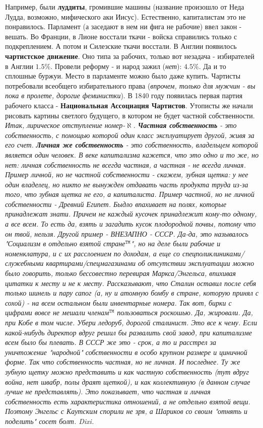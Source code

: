Например, были \textbf{луддиты}, громившие машины (название произошло от Неда Лудда, возможно, мифического аки Иисус). Естественно, капиталистам это не понравилось. Парламент (а заседают в нем ни фига не рабочие) ввел закон - вешать. Во Франции, в Лионе восстали ткачи - войска справились только с подкреплением. А потом и Силезские ткачи восстали. В Англии появилось \textbf{чартистское движение}. Оно типа за рабочих, только вот незадача - избирателей в Англии $1.5 \%$. Провели реформу - и народ зажил (\textit{нет}): $4.5 \%$. Да и то сплошные буржуи. Место в парламенте можно было даже купить. Чартисты потребовали всеобщего избирательного права (\textit{впрочем, только для мужчин - вы пока в пролете, дорогие феминистки}). В 1840 году появилась первая партия рабочего класса - \textbf{Национальная Ассоциация Чартистов}. Утописты же начали рисовать картины светлого будущего, в котором не будет частной собственности. \textit{Итак, лирическое отступление номер-$\aleph$. \textbf{Частная собственность} - это собственность, с помощью которой один класс эксплуатирует другой, живя за его счет. \textbf{Личная же собственность} - это собственность, владельцем которой является один человек. В веке капитализма кажется, что это одно и то же, но нет: личная собственность не всегда частная, а частная - не всегда личная. Пример личной, но не частной собственности - скажем, зубная щетка: у нее один владелец, но никто не вынужден отдавать часть продукта труда из-за того, что зубная щетка не его, а капиталиста. Пример частной, но не личной собственности - Древний Египет. Быдло впахивает на полях, которые принадлежат знати. Причем не каждый кусочек принадлежит кому-то одному, а все всем. То есть да, взять и загадить кусок плодородной почвы, потому что он твой, нельзя. Другой пример  - ВНЕЗАПНО - СССР. Да-да, это называлось "Социализм в отдельно взятой стране${}^\mathtt{TM}$", но на деле были рабочие и номенклатура, и с их расслоением по доходам, а еще со спецполиклиниками/служебными квартирами/спецмагазинами об отсутствии эксплуатации можно было говорить, только бессовестно перевирая Маркса/Энгельса, впихивая цитатки к месту и не к месту. Рассказывают, что Сталин оставил после себя только шинель и пару сапог (а, ну и атомную бомбу в стране, которую принял с сохой) - на всем остальном были инвентарные номера. Так вот, бирки с цифрами вовсе не мешали членам${}^\mathtt{TM}$ пользоваться роскошью. Да, жировали. Да, при Кобе в том числе. Убери ледоруб, дорогой сталинист. Это все к чему. Если какой-нибудь директор вдруг решил бы развалить свой завод, при капитализме всем было бы плевать. В СССР же это - срок, а то и расстрел за уничтожение "народной" собственности в особо крупном размере и циничной форме. Так что собственность частная, но не личная. И последнее. Ту же зубную щетку можно представить и как частную собственность (тут вдруг война, нет швабр, полы драят щеткой), и как коллективную (в данном случае лучше не представлять). Это показывает, что частная и личная собственность есть характеристика отношений, а не отдельно взятой вещи. Поэтому Энгельс с Каутским спорили не зря, а Шариков со своим "отнять и поделить" сосет болт. Dixi. 
}
